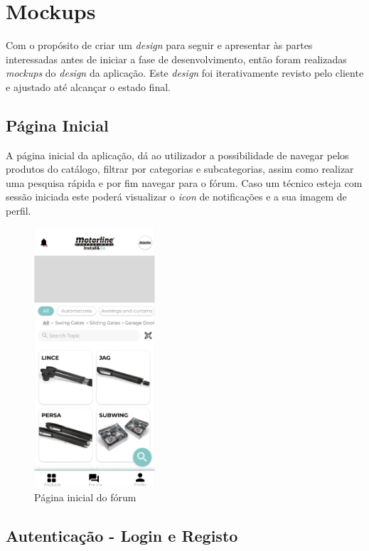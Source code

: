 \section{Mockups}
Com o propósito de criar um \textit{design} para seguir e apresentar às partes interessadas antes de iniciar a fase de desenvolvimento, então foram realizadas \textit{mockups} do \textit{design} da aplicação. Este \textit{design} foi iterativamente revisto pelo cliente e ajustado até alcançar o estado final.

\subsection{Página Inicial}

A página inicial da aplicação, dá ao utilizador a possibilidade de navegar pelos produtos do catálogo, filtrar por categorias e subcategorias, assim como realizar uma pesquisa rápida e por fim navegar para o fórum. Caso um técnico esteja com sessão iniciada este poderá visualizar o \textit{icon} de notificações e a sua imagem de perfil.

\begin{figure}[htb]
    \centering
    \includegraphics[width=0.4\textwidth]{images/mockups/home_screen.png}
    \caption{Página inicial do fórum}
    \label{fig:23}
\end{figure}

\newpage

\subsection{Autenticação - Login e Registo}

